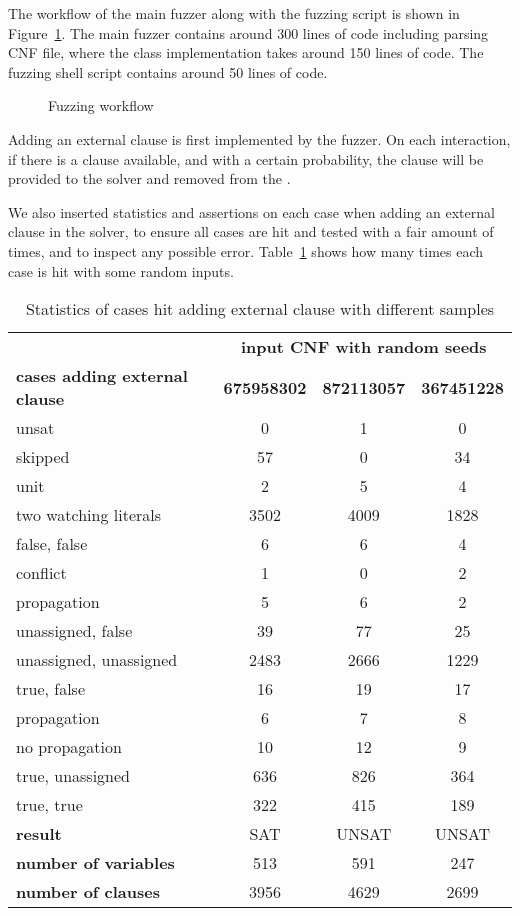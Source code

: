 The workflow of the main fuzzer along with the fuzzing script is shown in Figure~\ref{fig:fuzzer}. The main fuzzer contains around 300 lines of  code including parsing CNF file, where the  class implementation takes around 150 lines of code. The fuzzing shell script contains around 50 lines of code.

\begin{figure}[!htbp]
  \centering
  
  \caption{Fuzzing workflow}
  \label{fig:fuzzer}
\end{figure}

Adding an external clause is first implemented by the fuzzer. On each interaction, if there is a clause available, and with a certain probability, the clause will be provided to the solver and removed from the .

We also inserted statistics and assertions on each case when adding an external clause in the solver, to ensure all cases are hit and tested with a fair amount of times, and to inspect any possible error. Table~\ref{tab:stats} shows how many times each case is hit with some random inputs.

\begin{table}[!htbp]
  \centering
  \begin{tabular}{|l|c|c|c|}
    \hline
    & \multicolumn{3}{c|}{\textbf{input CNF with random seeds}} \\
    \cline{2-4}
    \textbf{cases adding external clause} & \textbf{675958302} & \textbf{872113057} & \textbf{367451228} \\
    \hline
    unsat & 0 & 1 & 0 \\
    skipped & 57 & 0 & 34 \\
    unit & 2 & 5 & 4 \\
    two watching literals & 3502 & 4009 & 1828 \\
    \quad false, false & 6 & 6 & 4 \\
    \quad\quad conflict & 1 & 0 & 2 \\
    \quad\quad propagation & 5 & 6 & 2 \\
    \quad unassigned, false & 39 & 77 & 25 \\
    \quad unassigned, unassigned & 2483 & 2666 & 1229 \\
    \quad true, false & 16 & 19 & 17 \\
    \quad\quad propagation & 6 & 7 & 8 \\
    \quad\quad no propagation & 10 & 12 & 9 \\
    \quad true, unassigned & 636 & 826 & 364 \\
    \quad true, true & 322 & 415 & 189 \\
    \hline
    \textbf{result} & SAT & UNSAT & UNSAT \\
    \textbf{number of variables} & 513 & 591 & 247 \\
    \textbf{number of clauses} & 3956 & 4629 & 2699 \\
    \hline
  \end{tabular}
  \caption{Statistics of cases hit adding external clause with different samples}
  \label{tab:stats}
\end{table}


